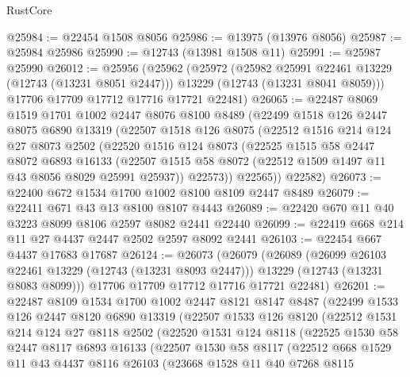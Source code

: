 \begin{lexlean}{RustCore}
\begin{coremodule}
@25984 := @22454 @1508 @8056
@25986 := @13975 (@13976 @8056)
@25987 := @25984 @25986
@25990 := @12743 (@13981 @1508 @11)
@25991 := @25987 @25990
@26012 := @25956
    (@25962
      (@25972
        (@25982 @25991 @22461 @13229 (@12743 (@13231 @8051 @2447)))
        @13229
        (@12743 (@13231 @8041 @8059)))
      @17706
      @17709
      @17712
      @17716
      @17721
      @22481)
@26065 := @22487
    @8069
    @1519
    @1701
    @1002
    @2447
    @8076
    @8100
    @8489
    (@22499
      @1518
      @126
      @2447
      @8075
      @6890
      @13319
      (@22507
        @1518
        @126
        @8075
        (@22512
          @1516
          @214
          @124
          @27
          @8073
          @2502
          (@22520
            @1516
            @124
            @8073
            (@22525
              @1515
              @58
              @2447
              @8072
              @6893
              @16133
              (@22507 @1515 @58 @8072 (@22512 @1509 @1497 @11 @43 @8056 @8029 @25991 @25937))
              @22573))
          @22565))
      @22582)
@26073 := @22400 @672 @1534 @1700 @1002 @8100 @8109 @2447 @8489
@26079 := @22411 @671 @43 @13 @8100 @8107 @4443
@26089 := @22420 @670 @11 @40 @3223 @8099 @8106 @2597 @8082 @2441 @22440
@26099 := @22419 @668 @214 @11 @27 @4437 @2447 @2502 @2597 @8092 @2441
@26103 := @22454 @667 @4437 @17683 @17687
@26124 := @26073
    (@26079
      (@26089
        (@26099 @26103 @22461 @13229 (@12743 (@13231 @8093 @2447)))
        @13229
        (@12743 (@13231 @8083 @8099)))
      @17706
      @17709
      @17712
      @17716
      @17721
      @22481)
@26201 := @22487
    @8109
    @1534
    @1700
    @1002
    @2447
    @8121
    @8147
    @8487
    (@22499
      @1533
      @126
      @2447
      @8120
      @6890
      @13319
      (@22507
        @1533
        @126
        @8120
        (@22512
          @1531
          @214
          @124
          @27
          @8118
          @2502
          (@22520
            @1531
            @124
            @8118
            (@22525
              @1530
              @58
              @2447
              @8117
              @6893
              @16133
              (@22507
                @1530
                @58
                @8117
                (@22512
                  @668
                  @1529
                  @11
                  @43
                  @4437
                  @8116
                  @26103
                  (@23668
                    @1528
                    @11
                    @40
                    @7268
                    @8115

\end{coremodule}
\end{lexlean}
